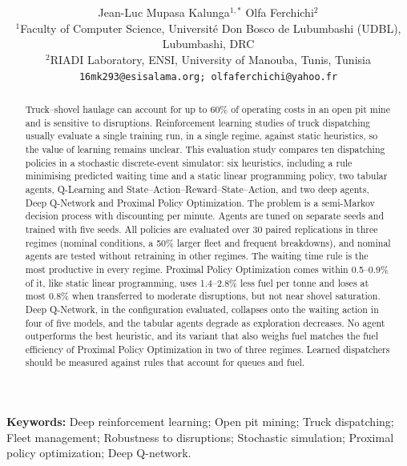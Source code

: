 \documentclass[11pt,a4paper]{article}
\title{\textbf{\corr{Deep Reinforcement Learning for Open Pit Mine Truck Dispatching: Productivity, Fuel Efficiency and Robustness across Operating Regimes}}}
\author{%
\begin{tabular}{c}
Jean-Luc Mupasa Kalunga$^{1,*}$ \qquad Olfa Ferchichi$^{2}$\\[0.5em]
{\small $^{1}$Faculty of Computer Science, Université Don Bosco de Lubumbashi (UDBL), Lubumbashi, DRC}\\
{\small $^{2}$RIADI Laboratory, ENSI, University of Manouba, Tunis, Tunisia}\\[0.3em]
{\small\texttt{16mk293@esisalama.org; olfaferchichi@yahoo.fr}}
\end{tabular}%
}
\date{}
\newif\ifrevmarks
\newcommand{\revtag}[1]{\ifrevmarks\textsuperscript{\textcolor{red!70!black}{\scriptsize[#1]}}\fi}
\newcommand{\rev}[2]{\ifrevmarks{\color{revcolor}#2}\revtag{#1}\else#2\fi}
\newenvironment{revbloc}[1]{\par\ifrevmarks\color{revcolor}\noindent\revtag{#1}\ \fi}{\par}
\newif\ifcorrmarks
\newcommand{\corr}[1]{\ifcorrmarks\textcolor{corrcolor}{#1}\else#1\fi}
\begin{document}
\maketitle


\begin{abstract}
\begin{revbloc}{m1, m2, M1, M3, v3, T31}
Truck--shovel haulage can \corr{account for up to 60\% of operating costs in an \corr{open pit} mine} and is \corr{sensitive} to disruptions. Reinforcement learning studies of truck dispatching usually evaluate a single training run, in a single \corr{regime}, against static heuristics, so the \corr{value of learning remains unclear}. \corr{This evaluation study compares} ten dispatching policies in a stochastic discrete-event simulator: six heuristics, including a \corr{rule minimising} predicted waiting time and a \corr{static} linear programming policy, two tabular agents, Q-Learning and State--Action--Reward--State--Action, and two deep agents, Deep Q-Network and Proximal Policy Optimization. \corr{The problem is a semi-Markov decision process with discounting per minute.} \corr{Agents are tuned on separate seeds and trained with five seeds.} All policies are evaluated over 30 paired replications in three regimes (nominal conditions, a 50\% larger fleet and frequent breakdowns), \corr{and nominal agents are tested without retraining} in \corr{other regimes}. \corr{The waiting time rule is the most productive in every regime.} Proximal Policy Optimization comes within 0.5--0.9\% of it, \corr{like static linear programming}, uses 1.4--2.8\% less fuel per tonne and \corr{loses at most 0.8\% when transferred to moderate disruptions, but not near shovel saturation}. Deep Q-Network\corr{, in the configuration evaluated,} collapses onto the waiting action in four of \corr{five} models, and the tabular agents degrade as exploration decreases. \corr{No agent outperforms the best heuristic, and its variant that also weighs fuel matches the fuel efficiency of Proximal Policy Optimization in two of three regimes. Learned dispatchers should be measured against rules that account for queues and fuel.}
\end{revbloc}
\end{abstract}


\noindent\textbf{Keywords:} \rev{m1}{Deep reinforcement learning; \corr{Open pit} mining; Truck dispatching; Fleet management; \corr{Robustness to disruptions}; Stochastic simulation; Proximal policy optimization; Deep Q-network.}

\end{document}
